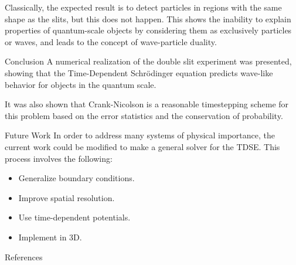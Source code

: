 \documentclass[final]{beamer}
\newlength{\onecolwid}
\begin{document}
\begin{frame}[t]
\begin{columns}[t]
\begin{column}{\onecolwid}
\begin{block}{}
	Classically, the expected result is to detect particles in regions with the same shape as the slits, but this does not happen. This shows the inability to explain properties of quantum-scale objects by considering them as exclusively particles or waves, and leads to the concept of wave-particle duality.
	
\end{block}
\begin{block}{Conclusion}
A numerical realization of the double slit experiment was presented, showing that the Time-Dependent Schr\"{o}dinger equation predicts wave-like behavior for objects in the quantum scale.\par
It was also shown that Crank-Nicolson is a reasonable timestepping scheme for this problem based on the error statistics and the conservation of probability.

\end{block}


\begin{block}{Future Work}
In order to address many systems of physical importance, the current work could be modified to make a general solver for the TDSE. This process involves the following:
\begin{itemize}
\item Generalize boundary conditions.
\item Improve spatial resolution.
\item Use time-dependent potentials.
\item Implement in 3D.
\end{itemize}

\end{block}


\begin{block}{References}

\nocite{*} %
\small{
\vspace{0.75in}}


\end{block}
\end{column}
\end{columns}
\end{frame}
\end{document}
